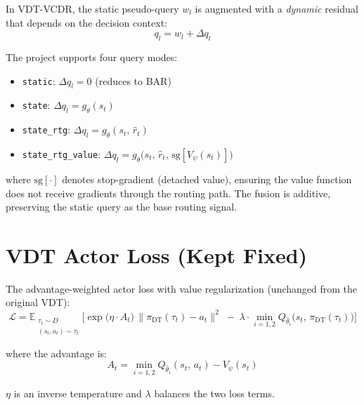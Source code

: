 \documentclass[11pt]{article}
\begin{document}
In VDT-VCDR, the static pseudo-query $w_l$ is augmented with a \emph{dynamic} residual that depends on the decision context:
\begin{equation}
    q_l = w_l + \Delta q_l
\end{equation}

The project supports four query modes:
\begin{itemize}[nosep]
    \item \texttt{static}: $\Delta q_l = 0$ (reduces to BAR)
    \item \texttt{state}: $\Delta q_l = g_\theta(s_t)$
    \item \texttt{state\_rtg}: $\Delta q_l = g_\theta(s_t,\, \hat{r}_t)$
    \item \texttt{state\_rtg\_value}: $\Delta q_l = g_\theta\!\big(s_t,\, \hat{r}_t,\, \mathrm{sg}[V_\psi(s_t)]\big)$
\end{itemize}

where $\mathrm{sg}[\cdot]$ denotes stop-gradient (detached value), ensuring the value function does not receive gradients through the routing path. The fusion is additive, preserving the static query as the base routing signal.


\section{VDT Actor Loss (Kept Fixed)}

The advantage-weighted actor loss with value regularization (unchanged from the original VDT):
\begin{equation}
    \mathcal{L} = \mathbb{E}_{\substack{\tau_t \sim D \\ (s_t, a_t) \sim \tau_t}}
    \Big[
        \exp\!\big(\eta \cdot A_t\big)\,
        \|\pi_{\mathrm{DT}}(\tau_t) - a_t\|^2
        \;-\;
        \lambda \cdot \min_{i=1,2} Q_{\hat{\theta}_i}\!\big(s_t,\, \pi_{\mathrm{DT}}(\tau_t)\big)
    \Big]
\end{equation}

where the advantage is:
\begin{equation}
    A_t = \min_{i=1,2} Q_{\hat{\theta}_i}(s_t,\, a_t) - V_\psi(s_t)
\end{equation}

$\eta$ is an inverse temperature and $\lambda$ balances the two loss terms.


\end{document}
